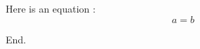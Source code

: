 \documentclass[a4paper,oneside,11pt]{book}
\begin{document}
 
    Here is an equation :
    \[
    a=b
    \]

    End.
\end{document}
